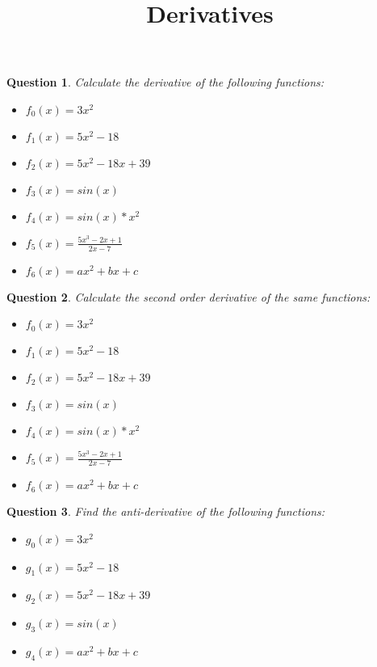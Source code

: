 \documentclass[]{article}
\title{Derivatives}
\author{}
\date{}
\newtheorem{question}{Question}
\begin{document}
	
	\maketitle
	
	
	\begin{question}
		Calculate the derivative of the following functions:\\
		\begin{itemize}
			\item $f_0(x) = 3x^2$
			\item $f_1(x) = 5x^2-18$
			\item $f_2(x) = 5x^2-18x+39$
			\item $f_3(x) = sin(x)$
			\item $f_4(x) = sin(x)*x^2$
			\item $f_5(x) = \frac{5x^3-2x+1}{2x-7}$
			\item $f_6(x) = ax^2+bx+c$
		\end{itemize}
	\end{question}
	
	\begin{question}
		Calculate the second order derivative of the same functions:\\
		\begin{itemize}
			\item $f_0(x) = 3x^2$
			\item $f_1(x) = 5x^2-18$
			\item $f_2(x) = 5x^2-18x+39$
			\item $f_3(x) = sin(x)$
			\item $f_4(x) = sin(x)*x^2$
			\item $f_5(x) = \frac{5x^3-2x+1}{2x-7}$
			\item $f_6(x) = ax^2+bx+c$
		\end{itemize}
	\end{question}
	
	\begin{question}
		Find the anti-derivative of the following functions:\\
		\begin{itemize}
			\item $g_0(x) = 3x^2$
			\item $g_1(x) = 5x^2-18$
			\item $g_2(x) = 5x^2-18x+39$
			\item $g_3(x) = sin(x)$
			\item $g_4(x) = ax^2+bx+c$
		\end{itemize}
	\end{question}
	
	
\end{document}
